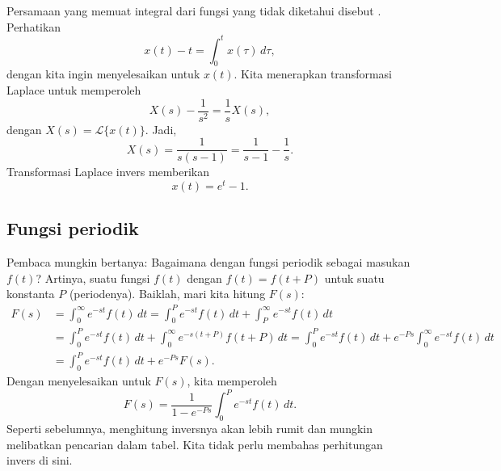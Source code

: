 \begin{example}
Persamaan yang memuat integral dari fungsi yang tidak diketahui
disebut \emph{}.
Perhatikan
\begin{equation*}
x(t) - t = \int_0^t x(\tau) \, d\tau ,
\end{equation*}
dengan kita ingin menyelesaikan untuk $x(t)$.
Kita menerapkan transformasi Laplace untuk memperoleh
\begin{equation*}
X(s) - \frac{1}{s^2} = \frac{1}{s} X(s) ,
\end{equation*}
dengan $X(s) = \mathcal{L} \bigl\{ x(t) \bigr\}$.  Jadi,
\begin{equation*}
X(s) = \frac{1}{s(s-1)} = \frac{1}{s-1} - \frac{1}{s} .
\end{equation*}
Transformasi Laplace invers memberikan
\begin{equation*}
x(t) = e^t - 1 .
\end{equation*}
\end{example}

\subsection{Fungsi periodik}

Pembaca mungkin bertanya: Bagaimana dengan fungsi periodik sebagai masukan $f(t)$?
Artinya, suatu fungsi $f(t)$ dengan $f(t) = f(t+P)$ untuk suatu konstanta $P$ (periodenya).
Baiklah, mari kita hitung $F(s)$:
\begin{equation*}
\begin{split}
F(s) & = \int_0^\infty e^{-st} f(t) \, dt
= \int_0^P e^{-st} f(t) \, dt
+ \int_P^\infty e^{-st} f(t) \, dt
\\
& = \int_0^P e^{-st} f(t) \, dt
+ \int_0^\infty e^{-s(t+P)} f(t+P) \, dt
= \int_0^P e^{-st} f(t) \, dt
+ e^{-Ps} \int_0^\infty e^{-st} f(t) \, dt
\\
& = \int_0^P e^{-st} f(t) \, dt
+ e^{-Ps} F(s) .
\end{split}
\end{equation*}
Dengan menyelesaikan untuk $F(s)$, kita memperoleh
\begin{equation*}
F(s)
=
\frac{1}{1-e^{-Ps}}
\int_0^P e^{-st} f(t) \, dt .
\end{equation*}
Seperti sebelumnya, menghitung inversnya akan lebih rumit dan mungkin
melibatkan pencarian dalam tabel.  Kita tidak perlu membahas perhitungan invers
di sini.

